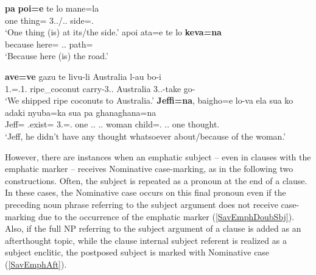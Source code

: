 \begin{exe}\ex\label{SavEmphNVer}
\begin{xlist}\ex\gll \textbf{pa} \textbf{poi=e} te lo mane=la\\
one thing=\emphat{} \emphat{} 3\sg{}.\mas{}.\gen{}/\deter{}.\sg{}.\mas{} side=\loc{}.\mas{}\\ 
\glt `One thing (is) at its/the side.'
\ex\gll apoi ata=e te lo \textbf{keva=na}\\
because here=\emphat{} \emphat{} \deter{}.\sg{}.\mas{} path=\nom{}\\
\glt `Because here (is) the road.'
\end{xlist}
\end{exe}
\begin{exe}\ex\label{SavEmphVerb}
\begin{xlist}\ex\gll \textbf{ave=ve} gazu te livu-li Australia l-au bo-i\\
1\pl{}.\excl{}=\emphat{}.1\pl{}.\excl{} ripe\_coconut \emphat{} carry-3\sg{}.\mas{}.\obj{} Australia 3\sg{}.\mas{}.\obj{}-take go-\fin{}\\
\glt `We shipped ripe coconuts to Australia.' %
\enlargethispage{\baselineskip}
\ex\gll \textbf{Jeffi=na}, baigho=e lo-va ela sua ko adaki nyuba=ka sua pa ghanaghana=na\\
Jeff=\nom{} \Neg{}.exist=\emphat{} 3\sg{}.\mas{}=\gen{}.\mas{} one \att{}.\sg{}.\mas{} \deter{}.\sg{}.\fem{} woman child=\loc{}.\fem{} \att{}.\sg{}.\mas{} one thought.\nom{}\\
\glt `Jeff, he didn't have any thought whatsoever about/because of the wom\-an.'
\end{xlist} 
\end{exe}

However, there are instances when an emphatic subject -- even in clauses with the emphatic marker -- receives Nominative case-marking, as in the following two constructions.
Often, the subject is repeated as a pronoun at the end  of a clause. 
In these cases, the Nominative case occurs on this final pronoun even if the preceding noun phrase referring to the subject argument does not receive case-marking due to the occurrence of the emphatic marker (\ref{SavEmphDoubSbj}).
Also, if the full NP referring to the subject argument of a clause is added as an afterthought topic, while the clause internal subject referent is realized as a subject enclitic, the postposed subject is marked with Nominative  case (\ref{SavEmphAft}).

